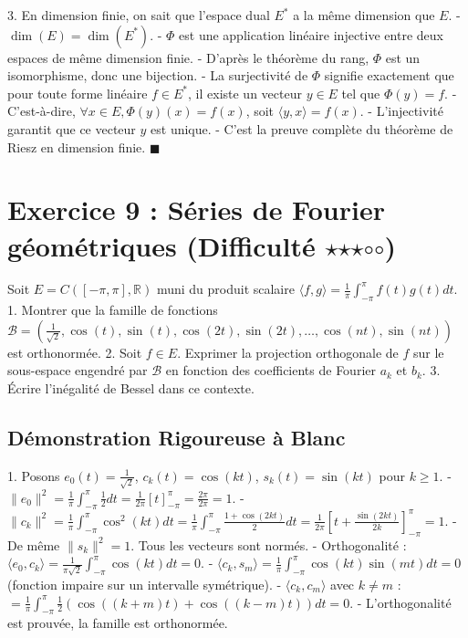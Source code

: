 \documentclass{report}
\begin{document}
3. En dimension finie, on sait que l'espace dual $E^*$ a la même dimension que $E$.
   - $\dim(E) = \dim(E^*)$.
   - $\Phi$ est une application linéaire injective entre deux espaces de même dimension finie.
   - D'après le théorème du rang, $\Phi$ est un isomorphisme, donc une bijection.
   - La surjectivité de $\Phi$ signifie exactement que pour toute forme linéaire $f \in E^*$, il existe un vecteur $y \in E$ tel que $\Phi(y) = f$.
   - C'est-à-dire, $\forall x \in E, \Phi(y)(x) = f(x)$, soit $\langle y, x \rangle = f(x)$.
   - L'injectivité garantit que ce vecteur $y$ est unique.
   - C'est la preuve complète du théorème de Riesz en dimension finie.
   $\blacksquare$

\newpage


\chapter*{Exercice 9 : Séries de Fourier géométriques (Difficulté $\star$$\star$$\star$$\circ$$\circ$)}

Soit $E = C([-\pi, \pi], \mathbb{R})$ muni du produit scalaire $\langle f, g \rangle = \frac{1}{\pi} \int_{-\pi}^\pi f(t)g(t)dt$.
1. Montrer que la famille de fonctions $\mathcal{B} = (\frac{1}{\sqrt{2}}, \cos(t), \sin(t), \cos(2t), \sin(2t), \ldots, \cos(nt), \sin(nt))$ est orthonormée.
2. Soit $f \in E$. Exprimer la projection orthogonale de $f$ sur le sous-espace engendré par $\mathcal{B}$ en fonction des coefficients de Fourier $a_k$ et $b_k$.
3. Écrire l'inégalité de Bessel dans ce contexte.

\section*{Démonstration Rigoureuse à Blanc}

1. Posons $e_0(t) = \frac{1}{\sqrt{2}}$, $c_k(t) = \cos(kt)$, $s_k(t) = \sin(kt)$ pour $k \ge 1$.
   - $\|e_0\|^2 = \frac{1}{\pi} \int_{-\pi}^\pi \frac{1}{2} dt = \frac{1}{2\pi} [t]_{-\pi}^\pi = \frac{2\pi}{2\pi} = 1$.
   - $\|c_k\|^2 = \frac{1}{\pi} \int_{-\pi}^\pi \cos^2(kt) dt = \frac{1}{\pi} \int_{-\pi}^\pi \frac{1 + \cos(2kt)}{2} dt = \frac{1}{2\pi} [t + \frac{\sin(2kt)}{2k}]_{-\pi}^\pi = 1$.
   - De même $\|s_k\|^2 = 1$. Tous les vecteurs sont normés.
   - Orthogonalité : $\langle e_0, c_k \rangle = \frac{1}{\pi \sqrt{2}} \int_{-\pi}^\pi \cos(kt) dt = 0$.
   - $\langle c_k, s_m \rangle = \frac{1}{\pi} \int_{-\pi}^\pi \cos(kt)\sin(mt) dt = 0$ (fonction impaire sur un intervalle symétrique).
   - $\langle c_k, c_m \rangle$ avec $k \neq m$ :
     $ = \frac{1}{\pi} \int_{-\pi}^\pi \frac{1}{2}(\cos((k+m)t) + \cos((k-m)t)) dt = 0 $.
   - L'orthogonalité est prouvée, la famille est orthonormée.
\end{document}
